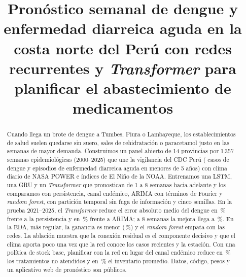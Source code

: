 \documentclass[conference,a4paper]{IEEEtran}
\begin{document}
\title{Pronóstico semanal de dengue y enfermedad diarreica aguda en la costa norte del Perú con redes recurrentes y \textit{Transformer} para planificar el abastecimiento de medicamentos}

\author{
}

\maketitle

\begin{abstract}
Cuando llega un brote de dengue a Tumbes, Piura o Lambayeque, los establecimientos de salud suelen quedarse sin suero, sales de rehidratación o paracetamol justo en las semanas de mayor demanda. Construimos un panel abierto de 14 provincias por 1\,357 semanas epidemiológicas (2000--2025) que une la vigilancia del CDC Perú (\ncasosDengue{} casos de dengue y \ncasosEDA{} episodios de enfermedad diarreica aguda en menores de 5 años) con clima diario de NASA POWER e índices de El Niño de la NOAA. Entrenamos una LSTM, una GRU y un \textit{Transformer} que pronostican de 1 a 8 semanas hacia adelante y los comparamos con persistencia, canal endémico, ARIMA con términos de Fourier y \textit{random forest}, con partición temporal sin fuga de información y cinco semillas. En la prueba 2021--2025, el \textit{Transformer} reduce el error absoluto medio del dengue en \nredTrPers\,\% frente a la persistencia y en \nredTrArima\,\% frente a ARIMA; a 8 semanas la mejora llega a \nredHochoTrPers\,\%. En la EDA, más regular, la ganancia es menor (\nredEPers\,\%) y el \textit{random forest} empata con las redes. La ablación muestra que la conexión residual es el componente decisivo y que el clima aporta poco una vez que la red conoce los casos recientes y la estación. Con una política de stock base, planificar con la red en lugar del canal endémico reduce en \nredSfal\,\% los tratamientos no atendidos y en \nredSinv\,\% el inventario promedio. Datos, código, pesos y un aplicativo web de pronóstico son públicos.
\end{abstract}
\end{document}

